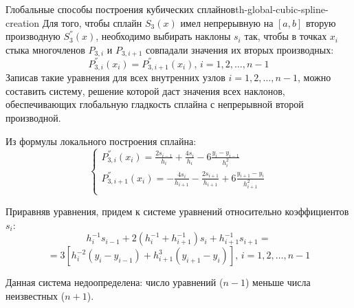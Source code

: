 \documentclass[14pt]{extarticle}
\begin{document}
    \begin{theorem}{Глобальные способы построения кубических сплайнов}{th-global-cubic-spline-creation}
        Для того, чтобы сплайн $S_{3}(x)$ имел непрерывную на $[a, b]$ вторую производную $S_{3}^{''}(x)$, необходимо выбирать наклоны $s_{i}$ так, чтобы в точках $x_{i}$ стыка многочленов $P_{3, i}$ и $P_{3, i + 1}$ совпадали значения их вторых производных:
        $$P_{3, i}^{''}(x_{i}) = P_{3, i+1}^{''}(x_{i}) \text{, } i = 1, 2, \ldots, n - 1$$
        Записав такие уравнения для всех внутренних узлов $i = 1, 2, \ldots, n-1$, можно составить систему, решение которой даст значения всех наклонов, обеспечивающих глобальную гладкость сплайна с непрерывной второй производной.

        \vspace{\baselineskip}

        Из формулы локального построения сплайна:
        $$
        \begin{cases}
            P_{3, i}^{''}(x_{i}) = \frac{2s_{i - 1}}{h_{i}} + \frac{4s_{i}}{h_{i}} - 6\frac{y_{i} - y_{i - 1}}{h_{i}^{2}}\\
            P_{3, i+1}^{''}(x_{i}) = -\frac{4s_{i}}{h_{i+1}} - \frac{2s_{i+1}}{h_{i+1}} + 6\frac{y_{i+1} - y_{i}}{h_{i+1}^2}\\
        \end{cases}
        $$

        Приравняв уравнения, придем к системе уравнений относительно коэффициентов $s_{i}$:
        $$h_{i}^{-1}s_{i - 1} + 2(h_{i}^{-1} + h_{i + 1}^{-1})s_{i} + h_{i+1}^{-1}s_{i+1} = $$
        $$= 3[h_{i}^{-2}(y_{i} - y_{i - 1}) + h_{i+1}^{3}(y_{i + 1} - y_{i})] \text{, } i = 1, 2, \ldots, n - 1$$
        
        \vspace{\baselineskip}

        Данная система недоопределена: число уравнений ($n-1$) меньше числа неизвестных ($n+1$).
    \end{theorem}
    
\end{document}
